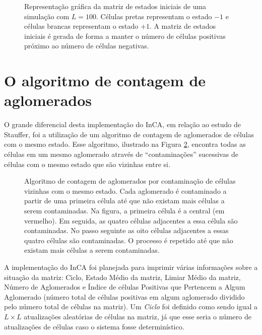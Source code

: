 \documentclass[
	12pt,				%
	openright,			%
	twoside,			%
	a4paper,			%
	english,			%
	french,				%
	spanish,			%
	brazil				%
	]{abntex2}
\begin{document}
\begin{figure}
    \centering
    \caption{Representação gráfica da matriz de estados iniciais de uma simulação com $L=100$. Células pretas representam o estado $-1$ e células brancas representam o estado $+1$. A matriz de estados iniciais é gerada de forma a manter o número de células positivas próximo ao número de células negativas.}
    \label{fig:matrizL100Ciclo0}
\end{figure}

\section*{O algoritmo de contagem de aglomerados}

O grande diferencial desta implementação do InCA, em relação ao estudo de Stauffer, foi a utilização de um algoritmo de contagem de aglomerados de células com o mesmo estado. Esse algoritmo, ilustrado na Figura \ref{fig:contamination}, encontra todas as células em um mesmo aglomerado através de ``contaminações'' sucessivas de células com o mesmo estado que são vizinhas entre si.

\begin{figure}
    \centering
    \caption{Algoritmo de contagem de aglomerados por contaminação de células vizinhas com o mesmo estado. Cada aglomerado é contaminado a partir de uma primeira célula até que não existam mais células a serem contaminadas. Na figura, a primeira célula é a central (em vermelho). Em seguida, as quatro células adjacentes a essa célula são contaminadas. No passo seguinte as oito células adjacentes a essas quatro células são contaminadas. O processo é repetido até que não existam mais células a serem contaminadas.}
    \label{fig:contamination}
\end{figure}

A implementação do InCA foi planejada para imprimir várias informações sobre a situação da matriz: Ciclo, Estado Médio da matriz, Limiar Médio da matriz, Número de Aglomerados e Índice de células Positivas que Pertencem a Algum Aglomerado (número total de células positivas em algum aglomerado dividido pelo número total de células na matriz). Um \textit{Ciclo} foi definido como sendo igual a $L\times L$ atualizações aleatórias de células na matriz, já que esse seria o número de atualizações de células caso o sistema fosse determinístico.
\end{document}

